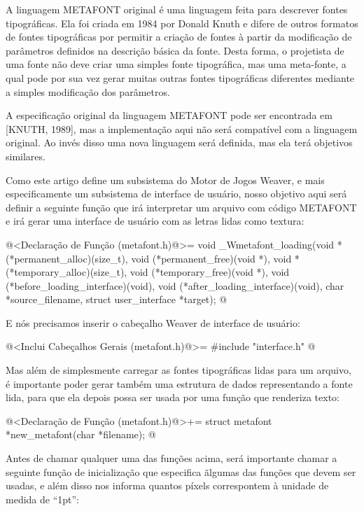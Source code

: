 
A linguagem METAFONT original é uma linguagem feita para descrever
fontes tipográficas. Ela foi criada em 1984 por Donald Knuth e difere
de outros formatos de fontes tipográficas por permitir a criação de
fontes à partir da modificação de parâmetros definidos na descrição
básica da fonte. Desta forma, o projetista de uma fonte não deve criar
uma simples fonte tipográfica, mas uma meta-fonte, a qual pode por sua
vez gerar muitas outras fontes tipográficas diferentes mediante a
simples modificação dos parâmetros.

A especificação original da linguagem METAFONT pode ser encontrada em
[KNUTH, 1989], mas a implementação aqui não será compatível com a
linguagem original. Ao invés disso uma nova linguagem será definida,
mas ela terá objetivos similares.

Como este artigo define um subsistema do Motor de Jogos Weaver, e mais
especificamente um subsistema de interface de usuário, nosso objetivo
aqui será definir a seguinte função que irá interpretar um arquivo com
código METAFONT e irá gerar uma interface de usuário com as letras
lidas como textura:

\iniciocodigo
@<Declaração de Função (metafont.h)@>=
void _Wmetafont_loading(void *(*permanent_alloc)(size_t),
                        void (*permanent_free)(void *),
                        void *(*temporary_alloc)(size_t),
                        void (*temporary_free)(void *),
                        void (*before_loading_interface)(void),
                        void (*after_loading_interface)(void),
                        char *source_filename,
                        struct user_interface *target);
@
\fimcodigo

E nós precisamos inserir o cabeçalho Weaver de interface de usuário:

\iniciocodigo
@<Inclui Cabeçalhos Gerais (metafont.h)@>=
#include "interface.h"
@
\fimcodigo

Mas além de simplesmente carregar as fontes tipográficas lidas para um
arquivo, é importante poder gerar também uma estrutura de dados
representando a fonte lida, para que ela depois possa ser usada por
uma função que renderiza texto:

\iniciocodigo
@<Declaração de Função (metafont.h)@>+=
struct metafont *new_metafont(char *filename);
@
\fimcodigo

Antes de chamar qualquer uma das funções acima, será importante chamar
a seguinte função de inicialização que especifica ãlgumas das funções
que devem ser usadas, e além disso nos informa quantos píxels
correspontem à unidade de medida de ``1pt'':

